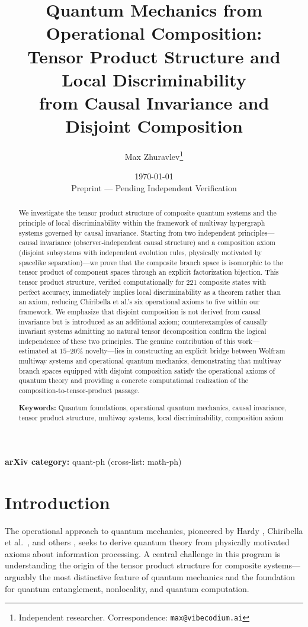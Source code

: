 \documentclass[11pt,a4paper]{article}
\title{Quantum Mechanics from Operational Composition:\\
Tensor Product Structure and Local Discriminability\\
from Causal Invariance and Disjoint Composition}
\author{Max Zhuravlev\thanks{Independent researcher. Correspondence: \texttt{max@vibecodium.ai}}}
\date{\today\\[1em]
\small Preprint ---{} Pending Independent Verification}
\theoremstyle{definition}
\theoremstyle{remark}
\begin{document}
\maketitle

\begin{abstract}
We investigate the tensor product structure of composite quantum systems
and the principle of local discriminability within the framework of
multiway hypergraph systems governed by causal invariance. Starting from
two independent principles---causal invariance (observer-independent
causal structure) and a composition axiom (disjoint subsystems with
independent evolution rules, physically motivated by spacelike
separation)---we prove that the composite branch space is isomorphic to
the tensor product of component spaces through an explicit factorization
bijection. This tensor product structure, verified computationally for
$221$ composite states with perfect accuracy, immediately implies local
discriminability as a theorem rather than an axiom, reducing Chiribella
et al.'s six operational axioms to five within our framework. We
emphasize that disjoint composition is not derived from causal invariance
but is introduced as an additional axiom; counterexamples of causally
invariant systems admitting no natural tensor decomposition confirm the
logical independence of these two principles. The genuine contribution of
this work---estimated at $15$--$20\%$ novelty---lies in constructing an
explicit bridge between Wolfram multiway systems and operational quantum
mechanics, demonstrating that multiway branch spaces equipped with
disjoint composition satisfy the operational axioms of quantum theory and
providing a concrete computational realization of the
composition-to-tensor-product passage.

\noindent\textbf{Keywords:} Quantum foundations, operational quantum
mechanics, causal invariance, tensor product structure, multiway systems,
local discriminability, composition axiom

\end{abstract}

\noindent\textbf{arXiv category:} quant-ph (cross-list: math-ph)

\section{Introduction}

The operational approach to quantum mechanics, pioneered by Hardy
\cite{hardy2001quantum}, Chiribella et al.\ \cite{chiribella2011informational},
and others \cite{masanes2011general,dakic2009quantum}, seeks to derive
quantum theory from physically motivated axioms about information
processing. A central challenge in this program is understanding the
origin of the tensor product structure for composite systems---arguably
the most distinctive feature of quantum mechanics and the foundation for
quantum entanglement, nonlocality, and quantum computation.
\end{document}
